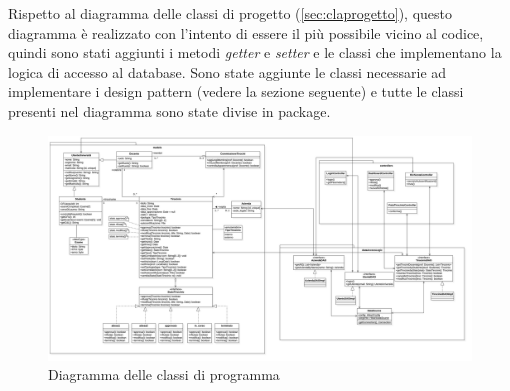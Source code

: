 \documentclass[12pt]{article}
\begin{document}
Rispetto al diagramma delle classi di progetto (\ref{sec:claprogetto}), questo diagramma è realizzato con l'intento di essere il più possibile vicino al codice, quindi sono stati aggiunti i metodi \textit{getter} e \textit{setter} e le classi che implementano la logica di accesso al database. Sono state aggiunte le classi necessarie ad implementare i design pattern (vedere la sezione seguente) e tutte le classi presenti nel diagramma sono state divise in package.

\begin{figure}[htb!]
   \centering
   \includegraphics[width=\textwidth]{images/ClassDiagramProgramma.jpg}
   \caption*{Diagramma delle classi di programma}
\end{figure}
\end{document}
